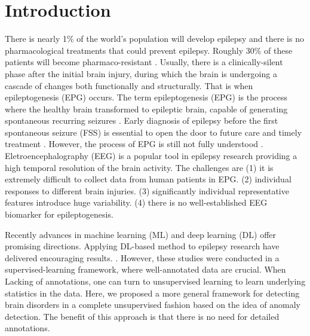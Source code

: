 \documentclass{article}
\begin{document}
	\section{Introduction}
	There is nearly 1\% of the world's population will develop epilepsy and there is no pharmacological treatments that could prevent epilepsy. Roughly 30\% of these patients will become pharmaco-resistant \citep{kwan2000early}. Usually, there is a clinically-silent phase after the initial brain injury, during which the brain is undergoing a cascade of changes both functionally and structurally. That is when epileptogenesis (EPG) occurs. The term epileptogenesis (EPG) is the process where the healthy brain transformed to epileptic brain, capable of generating spontaneous recurring seizures \cite{loscher2019holy, pitkanen2014past}. Early diagnosis of epilepsy before the first spontaneous seizure (FSS) is essential to open the door to future care and timely treatment \cite{moshe2015epilepsy}. However, the process of EPG is still not fully understood \cite{pitkanen2016advances}. Eletroencephalography (EEG) is a popular tool in epilepsy research providing a high temporal resolution of the brain activity. The challenges are (1) it is extremely difficult to collect data from human patients in EPG. (2) individual responses to different brain injuries. (3) significantly individual representative features introduce huge variability. (4) there is no well-established EEG biomarker for epileptogenesis.
	
	Recently advances in machine learning (ML) and deep learning (DL) offer promising directions. Applying DL-based method to epilepsy research have delivered encouraging results. \cite{lu2020towards, lu2020staging, rizzi2019changes}. However, these studies were conducted in a supervised-learning framework, where well-annotated data are crucial. When Lacking of annotations, one can turn to unsupervised learning to learn underlying statistics in the data. 	
	Here, we proposed a more general framework for detecting brain disorders in a complete unsupervised fashion based on the idea of anomaly detection. The benefit of this approach is that there is no need for detailed annotations.
	
\end{document}
